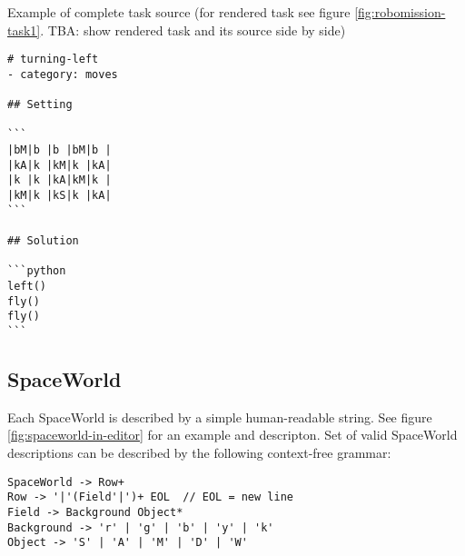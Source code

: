 

Example of complete task source (for rendered task see figure \ref{fig:robomission-task1}. TBA: show rendered task and its source side by side)

\begin{lstlisting}
# turning-left
- category: moves

## Setting

```
|bM|b |b |bM|b |
|kA|k |kM|k |kA|
|k |k |kA|kM|k |
|kM|k |kS|k |kA|
```

## Solution

```python
left()
fly()
fly()
```
\end{lstlisting}


\subsection{SpaceWorld}

Each SpaceWorld is described by a simple human-readable string.
See figure \ref{fig:spaceworld-in-editor} for an example and descripton.
Set of valid SpaceWorld descriptions can be described by the
following context-free grammar:

\begin{lstlisting}
SpaceWorld -> Row+
Row -> '|'(Field'|')+ EOL  // EOL = new line
Field -> Background Object*
Background -> 'r' | 'g' | 'b' | 'y' | 'k'
Object -> 'S' | 'A' | 'M' | 'D' | 'W'
\end{lstlisting}




